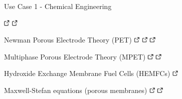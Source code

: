 \documentclass[compress,newPxFont,sthlmFooter]{beamer}
\begin{document}
\begin{frame}[plain]{Use Case 1 - Chemical Engineering}
\begin{itemize}
{                \href{http://daetools.com/docs/tutorials-chemeng.html\#tutorial-che-4}{\includegraphics[align=b, height=0.8em]{link.png}}
                \href{http://daetools.com/docs/tutorials-chemeng.html\#tutorial-che-5}{\includegraphics[align=b, height=0.8em]{link.png}}
          \item \alert{Newman Porous Electrode Theory} (PET) 
                \href{http://dx.doi.org/10.1007/0-306-47508-1_13}{\includegraphics[align=b, height=0.8em]{link.png}} 
                \href{http://daetools.com/docs/tutorials-chemeng.html\#tutorial-che-6}{\includegraphics[align=b, height=0.8em]{link.png}}
                \href{https://github.com/raybsmith/daetools-example-battery}{\includegraphics[align=b, height=0.8em]{link.png}}
          \item \alert{Multiphase Porous Electrode Theory} (MPET)
                \href{https://arxiv.org/abs/1702.08432}{\includegraphics[align=b, height=0.8em]{link.png}} 
                \href{https://bitbucket.org/bazantgroup/mpet}{\includegraphics[align=b, height=0.8em]{link.png}}
          \item \alert{Hydroxide Exchange Membrane Fuel Cells} (HEMFCs)
                \href{http://doi.org/10.1038/nnano.2016.265}{\includegraphics[align=b, height=0.8em]{link.png}}
          \item \alert{Maxwell-Stefan equations} (porous membranes)
                \href{http://doi.org/10.1007/s10450-015-9670-z}{\includegraphics[align=b, height=0.8em]{link.png}} 
                \href{http://daetools.com/docs/tutorials-chemeng.html\#tutorial-che-8}{\includegraphics[align=b, height=0.8em]{link.png}}
}
\end{itemize}
\end{frame}
\end{document}
